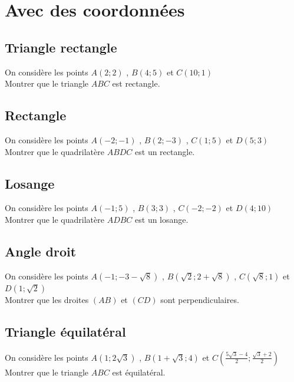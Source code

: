 \documentclass[oneside,12pt]{book}          %
\begin{document}
\section{Avec des coordonnées}

\subsection{Triangle rectangle}

On considère les points $A(2;2)$ , $B(4;5)$ et $C(10;1)$\\
Montrer que le triangle $ABC$ est rectangle.



\subsection{Rectangle}

On considère les points $A(-2;-1)$ , $B(2;-3)$ , $C(1;5)$ et $D(5;3)$\\
Montrer que le quadrilatère $ABDC$ est un rectangle.



\subsection{Losange}

On considère les points $A(-1;5)$ , $B(3;3)$ , $C(-2;-2)$ et $D(4;10)$\\
Montrer que le quadrilatère $ADBC$ est un losange.



\subsection{Angle droit}

On considère les points $A(-1;-3-\sqrt{8})$ , $B(\sqrt{2};2+\sqrt{8})$ , $C(\sqrt{8};1)$ et $D(1;\sqrt{2})$\\
Montrer que les droites $(AB)$ et $(CD)$ sont perpendiculaires.



\subsection{Triangle équilatéral}

On considère les points $A(1;2\sqrt{3})$ , $B(1+\sqrt{3};4)$ et $C\left(\frac{5\sqrt{3}-4}{2};\frac{\sqrt{3}+2}{2}\right)$\\
Montrer que le triangle $ABC$ est équilatéral.
\end{document}
